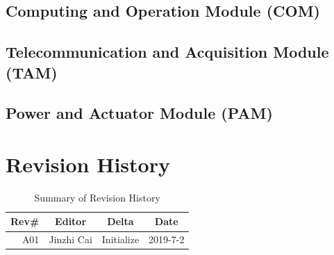 \documentclass[12pt,article]{memoir}
\begin{document}
\section{Computing and Operation Module (COM)}
\section{Telecommunication and Acquisition Module (TAM)}
\section{Power and Actuator Module (PAM)}
\newpage
\chapter{Revision History}
\begin{table}[H]
	\centering
	\begin{tabu}{r || c | c | c }
		Rev\# & Editor & Delta & Date\\ \hline
		A01 & Jinzhi Cai & Initialize  & 2019-7-2\\ \hline
	\end{tabu}
	\caption{Summary of Revision History}
	\label{tab:edatools}
\end{table}
\end{document}
